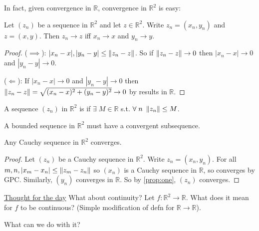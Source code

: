     In fact, given convergence in $\mathbb{R}$, convergence in $\mathbb{R}^2$ is easy:
    \begin{proposition} \label{prop:one}
        Let $(z_n)$ be a sequence in $\mathbb{R}^2$ and let $z \in \mathbb{R}^2$.
        Write $z_n = (x_n, y_n)$ and $z = (x, y)$.
        Then $z_n \to z$ iff $x_n \to x$ and $y_n \to y$.
    \end{proposition} 

    \begin{proof}
        ($\implies$): $|x_n - x|, |y_n - y| \leq \left \lVert z_n - z \right \rVert$.
        So if $\left \lVert z_n - z \right \rVert \to 0$ then $|x_n - x| \to 0$ and $|y_n - y| \to 0$.

        ($\Longleftarrow$): If $|x_n - x| \to 0$ and $|y_n - y| \to 0$ then $\left \lVert z_n - z \right \rVert = \sqrt{(x_n - x)^2 + (y_n - y)^2} \to 0$ by results in $\mathbb{R}$.
    \end{proof} 

    \begin{definition}
        A sequence $(z_n)$ in $\mathbb{R}^2$ is  if $\exists \; M \in \mathbb{R}$ s.t. $\forall \; n \ \left \lVert z_n \right \rVert \leq M$.
    \end{definition} 

    \begin{theorem}
        A bounded sequence in $\mathbb{R}^2$ must have a convergent subsequence.
    \end{theorem} 

    \begin{theorem}
        Any Cauchy sequence in $\mathbb{R}^2$ converges.
    \end{theorem} 

    \begin{proof}
        Let $(z_n)$ be a Cauchy sequence in $\mathbb{R}^2$.
        Write $z_n = (x_n, y_n)$.
        For all $m, n, |x_m - x_n| \leq \left \lVert z_m - z_n \right \rVert$ so $(x_n)$ is a Cauchy sequence in $\mathbb{R}$, so converges by GPC.
        Similarly, $(y_n)$ converges in $\mathbb{R}$.
        So by \ref{prop:one}, $(z_n)$ converges.
    \end{proof} 

    \underline{Thought for the day} What about continuity?
    Let $f: \mathbb{R}^2 \to \mathbb{R}$.
    What does it mean for $f$ to be continuous?
    (Simple modification of defn for $\mathbb{R} \to \mathbb{R}$).

    What can we do with it?

